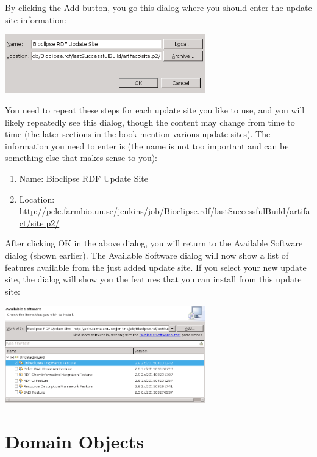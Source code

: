 \documentclass[a5paper, 10pt]{memoir}
\begin{document}
\begin{refsection}
By clicking the Add button, you go this dialog where you should enter the update
site information:

\begin{center}
\includegraphics[width=0.65\textwidth]{images/bcUpdateSites1.png}
\end{center}

You need to repeat these steps for each update site you like to use, and you
will likely repeatedly see this dialog, though the content may change from time to
time (the later sections in the book mention various update sites). The
information you need to enter is (the name is not too important and can be something
else that makes sense to you):

\begin{enumerate}
\item Name: Bioclipse RDF Update Site
\item Location: \url{http://pele.farmbio.uu.se/jenkins/job/Bioclipse.rdf/lastSuccessfulBuild/artifact/site.p2/}
\end{enumerate}

After clicking OK in the above dialog, you will return to the Available Software dialog (shown earlier).
The Available Software dialog will now show a list of features available from the just added update site.
If you select your new update site, the dialog will show you the features that you can install from
this update site:

\begin{center}
\includegraphics[width=0.65\textwidth]{images/bcUpdateSites2.png}
\end{center}

\section{Domain Objects}


\end{refsection}
\end{document}
